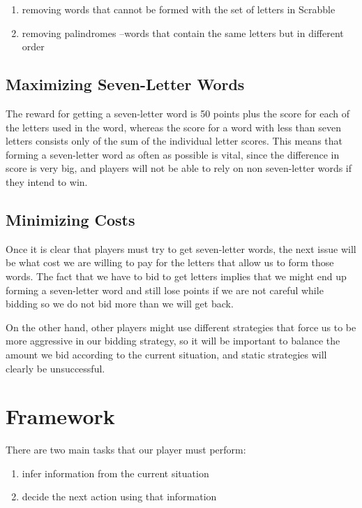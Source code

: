 \documentclass[11pt]{article}
\begin{document}
\begin{enumerate}
\item removing words that cannot be formed with the set of letters in Scrabble
\item removing palindromes --words that contain the same letters but in different order
\end{enumerate}

\subsection{Maximizing Seven-Letter Words}

The reward for getting a seven-letter word is 50 points plus the score for each of the letters used in the word, whereas the score for a word with less than seven letters consists only of the sum of the individual letter scores. This means that forming a seven-letter word as often as possible is vital, since the difference in score is very big, and players will not be able to rely on non seven-letter words if they intend to win.

\subsection{Minimizing Costs}

Once it is clear that players must try to get seven-letter words, the next issue will be what cost we are willing to pay for the letters that allow us to form those words. The fact that we have to bid to get letters implies that we might end up forming a seven-letter word and still lose points if we are not careful while bidding so we do not bid more than we will get back. 

On the other hand, other players might use different strategies that force us to be more aggressive in our bidding strategy, so it will be important to balance the amount we bid according to the current situation, and static strategies will clearly be unsuccessful. 

\section{Framework}

There are two main tasks that our player must perform:

\begin{enumerate}
\item infer information from the current situation
\item decide the next action using that information
\end{enumerate}
\end{document}
